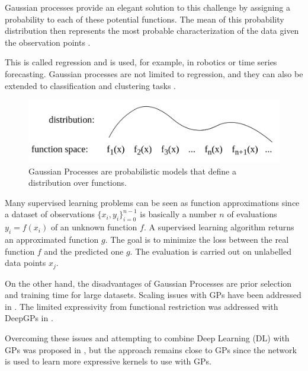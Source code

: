 Gaussian processes provide an elegant solution to this challenge by assigning a probability to each of these potential functions. The mean of this probability distribution then represents the most probable characterization of the data given the observation points \cite{Goertler2018VisualExplorationGaussian}. 

This is called regression and is used, for example, in robotics or time series forecasting. Gaussian processes are not limited to regression, and they can also be extended to classification and clustering tasks \cite{kapoor2010gaussian} \cite{kim2007clustering}. 
\begin{figure}
	\centering
	\includegraphics[width=0.9\linewidth]{Images/GP.png}
	\caption{Gaussian Processes are probabilistic models that define a distribution over functions.}
	\label{fig:gp}
\end{figure}
Many supervised learning problems can be seen as function approximations since a dataset of observations $ \{x_i, y_i\}^{n-1}_{i=0}$ is basically a number $n$ of evaluations $y_i = f(x_i)$ of an unknown function $f$. A supervised learning algorithm returns an approximated function $g$. The goal is to minimize the loss between the real function $f$ and the predicted one $g$. The evaluation is carried out on unlabelled data points $x_j$.

On the other hand, the disadvantages of Gaussian Processes are prior selection and training time for large datasets. Scaling issues with GPs have been addressed in \cite{snelson2006sparse}. The limited expressivity from functional restriction was addressed with DeepGPs in \cite{damianou2013deep}  \cite{salimbeni2017doubly}. 

Overcoming these issues and attempting to combine Deep Learning (DL) with GPs was proposed in \cite{wilson2016deep}, but the approach remains close to GPs since the network is used to learn more expressive kernels to use with GPs.

